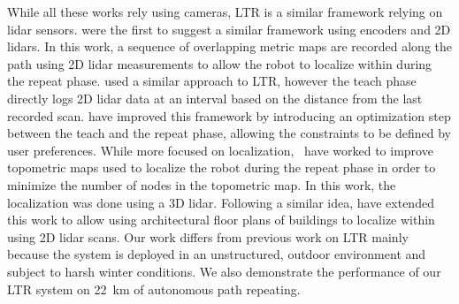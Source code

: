 While all these works rely using cameras, \ac{LTR} is a similar framework relying on lidar sensors.
\citet{Marshall2008} were the first to suggest a similar framework using encoders and 2D lidars.
In this work, a sequence of overlapping metric maps are recorded along the path using 2D lidar measurements to allow the robot to localize within during the repeat phase.
\citet{Sprunk2013} used a similar approach to \ac{LTR}, however the teach phase directly logs 2D lidar data at an interval based on the distance from the last recorded scan.
\citet{Mazuran2015} have improved this framework by introducing an optimization step between the teach and the repeat phase, allowing the constraints to be defined by user preferences.
While more focused on localization,~\citet{Landry2016} have worked to improve topometric maps used to localize the robot during the repeat phase in order to minimize the number of nodes in the topometric map.
In this work, the localization was done using a 3D lidar. 
Following a similar idea, \citet{Boniardi2017} have extended this work to allow using architectural floor plans of buildings to localize within using 2D lidar scans.
Our work differs from previous work on \ac{LTR} mainly because the system is deployed in an unstructured, outdoor environment and subject to harsh winter conditions. 
We also demonstrate the performance of our \ac{LTR} system on \SI{22}{km} of autonomous path repeating.





